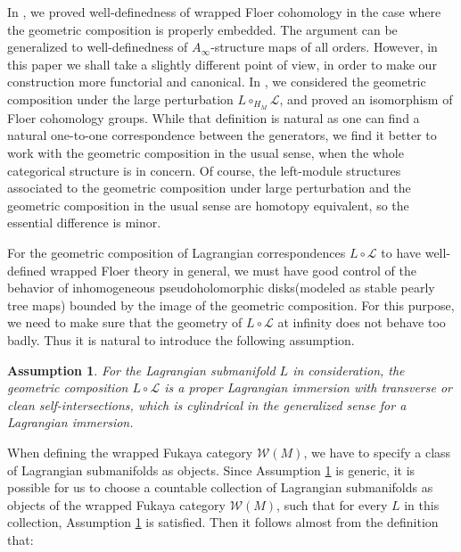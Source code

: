 \documentclass{amsart}
\newtheorem{assumption}[theorem]{Assumption}
\numberwithin{equation}{section}
\numberwithin{figure}{section}
\begin{document}
	In \cite{Gao1}, we proved well-definedness of wrapped Floer cohomology in the case where the geometric composition is properly embedded. The argument can be generalized to well-definedness of $A_{\infty}$-structure maps of all orders. However, in this paper we shall take a slightly different point of view, in order to make our construction more functorial and canonical. In \cite{Gao1}, we considered the geometric composition under the large perturbation $L \circ_{H_{M}} \mathcal{L}$, and proved an isomorphism of Floer cohomology groups. While that definition is natural as one can find a natural one-to-one correspondence between the generators, we find it better to work with the geometric composition in the usual sense, when the whole categorical structure is in concern. Of course, the left-module structures associated to the geometric composition under large perturbation and the geometric composition in the usual sense are homotopy equivalent, so the essential difference is minor. \par
	
	For the geometric composition of Lagrangian correspondences $L \circ \mathcal{L}$ to have well-defined wrapped Floer theory in general, we must have good control of the behavior of inhomogeneous pseudoholomorphic disks(modeled as stable pearly tree maps) bounded by the image of the geometric composition. For this purpose, we need to make sure that the geometry of $L \circ \mathcal{L}$ at infinity does not behave too badly. Thus it is natural to introduce the following assumption. \par

\begin{assumption}\label{assumption on the geometric composition}
	For the Lagrangian submanifold $L$ in consideration, the geometric composition $L \circ \mathcal{L}$ is a proper Lagrangian immersion with transverse or clean self-intersections, which is cylindrical in the generalized sense for a Lagrangian immersion.
\end{assumption}

	When defining the wrapped Fukaya category $\mathcal{W}(M)$, we have to specify a class of Lagrangian submanifolds as objects. Since Assumption \ref{assumption on the geometric composition} is generic, it is possible for us to choose a countable collection of Lagrangian submanifolds as objects of the wrapped Fukaya category $\mathcal{W}(M)$, such that for every $L$ in this collection, Assumption \ref{assumption on the geometric composition} is satisfied. Then it follows almost from the definition that: \par
\end{document}
